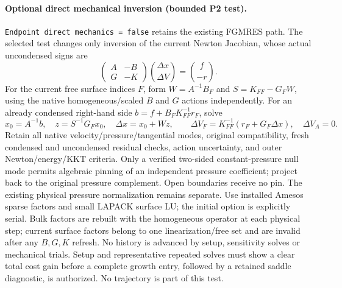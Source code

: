 \paragraph{Optional direct mechanical inversion (bounded P2 test).}
\texttt{Endpoint direct mechanics = false} retains the existing FGMRES path.
The selected test changes only inversion of the current Newton Jacobian,
whose actual uncondensed signs are
\[
 \begin{pmatrix}A&-B\\G&-K\end{pmatrix}
 \binom{\Delta x}{\Delta V}=\binom{f}{-r}.
\]
For the current free surface indices $F$, form $W=A^{-1}B_F$ and
$S=K_{FF}-G_FW$, using the native homogeneous/scaled $B$ and $G$ actions
independently. For an already condensed right-hand side
$b=f+B_FK_{FF}^{-1}r_F$, solve
\[
 x_0=A^{-1}b,\quad z=S^{-1}G_Fx_0,\quad
 \Delta x=x_0+Wz,\qquad
 \Delta V_F=K_{FF}^{-1}(r_F+G_F\Delta x),\quad\Delta V_A=0.
\]
Retain all native velocity/pressure/tangential modes, original compatibility,
fresh condensed and uncondensed residual checks, action uncertainty, and outer
Newton/energy/KKT criteria. Only a verified two-sided constant-pressure null
mode permits algebraic pinning of an independent pressure coefficient; project
back to the original pressure complement. Open boundaries receive no pin.
The existing physical pressure normalization remains separate.
Use installed Amesos sparse factors and small LAPACK surface LU; the initial
option is explicitly serial. Bulk factors are rebuilt with the homogeneous
operator at each physical step; current surface factors belong to one
linearization/free set and are invalid after any $B,G,K$ refresh. No history
is advanced by setup, sensitivity solves or mechanical trials. Setup and
representative repeated solves must show a clear total cost gain before a
complete growth entry, followed by a retained saddle diagnostic, is authorized.
No trajectory is part of this test.


